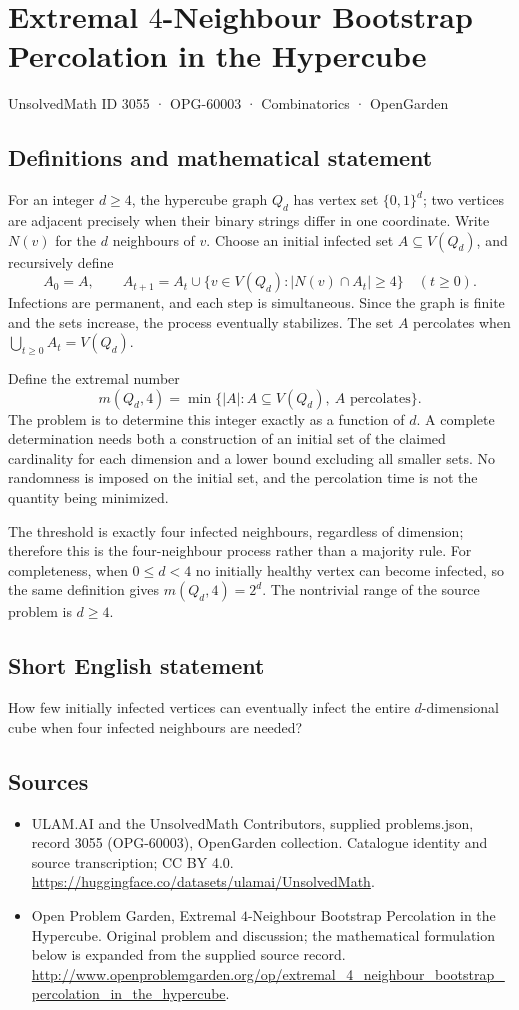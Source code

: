 \documentclass[11pt,a4paper]{article}
\begin{document}
\section*{Extremal $4$-Neighbour Bootstrap Percolation in the Hypercube}\label{3055}
{\small UnsolvedMath ID 3055 · OPG-60003 · Combinatorics · OpenGarden}
\subsection{Definitions and mathematical statement}
For an integer $d\ge4$, the hypercube graph $Q_d$ has vertex set
$\{0,1\}^d$; two vertices are adjacent precisely when their binary strings
differ in one coordinate. Write $N(v)$ for the $d$ neighbours of $v$.
Choose an initial infected set $A\subseteq V(Q_d)$, and recursively define
\[
 A_0=A,\qquad
 A_{t+1}=A_t\cup\{v\in V(Q_d):|N(v)\cap A_t|\ge4\}
 \quad(t\ge0).
\]
Infections are permanent, and each step is simultaneous. Since the graph
is finite and the sets increase, the process eventually stabilizes.
The set $A$ percolates when $\bigcup_{t\ge0}A_t=V(Q_d)$.

Define the extremal number
\[
 m(Q_d,4)=\min\{|A|:A\subseteq V(Q_d),\ A\text{ percolates}\}.
\]
The problem is to determine this integer exactly as a function of $d$.
A complete determination needs both a construction of an initial set of
the claimed cardinality for each dimension and a lower bound excluding
all smaller sets. No randomness is imposed on the initial set, and the
percolation time is not the quantity being minimized.

The threshold is exactly four infected neighbours, regardless of dimension;
therefore this is the four-neighbour process rather than a majority rule.
For completeness, when $0\le d<4$ no initially healthy vertex can become
infected, so the same definition gives $m(Q_d,4)=2^d$. The nontrivial range
of the source problem is $d\ge4$.
\subsection{Short English statement}
How few initially infected vertices can eventually infect the entire $d$-dimensional cube when four infected neighbours are needed?
\subsection{Sources}
\begin{itemize}
\item[S1] ULAM.AI and the UnsolvedMath Contributors, supplied problems.json, record 3055 (OPG-60003), OpenGarden collection. Catalogue identity and source transcription; CC BY 4.0.
\url{https://huggingface.co/datasets/ulamai/UnsolvedMath}.
\item[S2] Open Problem Garden, Extremal $4$-Neighbour Bootstrap Percolation in the Hypercube. Original problem and discussion; the mathematical formulation below is expanded from the supplied source record.
\url{http://www.openproblemgarden.org/op/extremal_4_neighbour_bootstrap_percolation_in_the_hypercube}.
\end{itemize}
\end{document}

